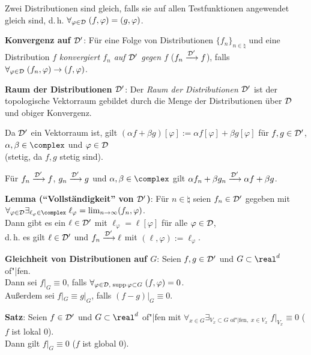 Zwei Distributionen sind gleich, falls sie auf allen Testfunktionen angewendet
gleich sind, d.\,h. $\forall_{\varphi \in \mathcal{D}}\; (f, \varphi) = (g, \varphi)$.

\textbf{Konvergenz auf $\mathcal{D}'$}:
Für eine Folge von Distributionen $\{f_n\}_{n \in \natural}$ und
eine Distribution $f$ \emph{konvergiert $f_n$ auf $\mathcal{D}'$ gegen $f$}
($f_n \xrightarrow{\mathcal{D}'} f$), falls
$\forall_{\varphi \in \mathcal{D}}\; (f_n, \varphi) \to (f, \varphi)$.

\textbf{Raum der Distributionen $\mathcal{D}'$}:
Der \emph{Raum der Distributionen $\mathcal{D}'$} ist der topologische Vektorraum
gebildet durch die Menge der Distributionen über $\mathcal{D}$ und obiger Konvergenz.

Da $\mathcal{D}'$ ein Vektorraum ist, gilt
$(\alpha f + \beta g)[\varphi] := \alpha f[\varphi] + \beta g[\varphi]$
für $f, g \in \mathcal{D}'$, $\alpha, \beta \in \complex$ und $\varphi \in \mathcal{D}$\\
(stetig, da $f, g$ stetig sind).

Für $f_n \xrightarrow{\mathcal{D}'} f$, $g_n \xrightarrow{\mathcal{D}'} g$ und
$\alpha, \beta \in \complex$ gilt
$\alpha f_n + \beta g_n \xrightarrow{\mathcal{D}'} \alpha f + \beta g$.

\linie

\textbf{Lemma ("`Vollständigkeit"' von $\mathcal{D}'$)}:
Für $n \in \natural$ seien $f_n \in \mathcal{D}'$ gegeben mit\\
$\forall_{\varphi \in \D} \exists_{\ell_\varphi \in \complex}\;
\ell_\varphi = \lim_{n \to \infty} (f_n, \varphi)$.\\
Dann gibt es ein $\ell \in \mathcal{D}'$ mit $\ell_\varphi = \ell[\varphi]$ für
alle $\varphi \in \mathcal{D}$,\\
d.\,h. es gilt $\ell \in \mathcal{D}'$ und $f_n \xrightarrow{\mathcal{D}'} \ell$ mit
$(\ell, \varphi) := \ell_\varphi$.

\linie

\textbf{Gleichheit von Distributionen auf $G$}:
Seien $f, g \in \mathcal{D}'$ und $G \subset \real^d$ of"|fen.\\
Dann sei $f|_G \equiv 0$, falls
$\forall_{\varphi \in \mathcal{D},\; \operatorname{supp} \varphi \subset G}\; (f, \varphi) = 0$.\\
Außerdem sei $f|_G \equiv g|_G$, falls $(f - g)|_G \equiv 0$.

\textbf{Satz}:
Seien $f \in \mathcal{D}'$ und $G \subset \real^d$ of"|fen mit
$\forall_{x \in G} \exists_{V_x \subset G \text{ of"|fen},\; x \in V_x}\;
f|_{V_x} \equiv 0$
($f$ ist lokal $0$).\\
Dann gilt $f|_G \equiv 0$
($f$ ist global $0$).

